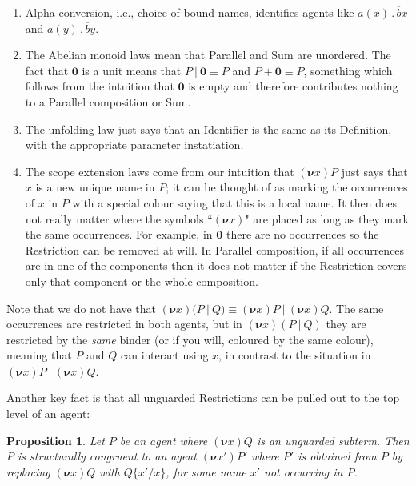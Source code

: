 \documentclass[10pt,a4paper]{article}
\newcommand{\resp}[1]{(\boldsymbol{\nu}#1)}
\newcommand{\res}[2]{\resp{#1}#2}
\newcommand{\nil}{\mathbf{0}}
\newcommand{\outp}[2]{\overline{#1}#2}
\newcommand{\inpp}[2]{#1(#2)}
\newcommand{\prefix}[2]{{#1}\,.\,#2}
\newcommand{\inp}[3]{\prefix{\inpp{#1}{#2}}{#3}}
\newcommand{\para}{\:|\:}
\newtheorem{theorem}{Proposition}
\begin{document}
\begin{enumerate}

\item Alpha-conversion, i.e., choice of bound names, identifies agents like $\inp{a}{x}{\outp{b}{x}}$ and $\inp{a}{y}{\outp{b}{y}}$.

\item The Abelian monoid laws mean that Parallel and Sum are unordered. The fact that $\nil$ is a unit means that $P \para \nil \equiv P$ and $P + \nil \equiv P$, something which follows from the intuition that $\nil$ is empty and therefore contributes nothing to a Parallel composition or Sum.

\item The unfolding law just says that an Identifier is the same as its Definition, with the appropriate parameter instatiation.

\item The scope extension laws come from our intuition that $\res{x}{P}$ just says that $x$ is a new unique name in $P$; it can be thought of as marking the occurrences of $x$ in $P$ with a special colour saying that this is a local name. It then does not really matter where the symbols ``$\resp{x}$" are placed as long as they mark the same occurrences. For example, in $\nil$ there are no occurrences so the Restriction can be removed at will. In Parallel composition, if all occurrences are in one of the components then it does not matter if the Restriction covers only that component or the whole composition.

\end{enumerate}

Note that we do not have that $\res{x}{(P \para Q)} \equiv \res{x}{P} \para \res{x}{Q}$. The same occurrences are restricted in both agents, but in $\res{x}{(P \para Q)}$ they are restricted by the \emph{same} binder (or if you will, coloured by the same colour), meaning that $P$ and $Q$ can interact using $x$, in contrast to the situation in $\res{x}{P} \para \res{x}{Q}$.

Another key fact is that all unguarded Restrictions can be pulled out to the top level of an agent:

\begin{theorem} Let $P$ be an agent where $\res{x}{Q}$ is an unguarded subterm. Then $P$ is structurally congruent to an agent $\res{x'}{P'}$  where $P'$ is obtained from $P$ by replacing $\res{x}{Q}$ with $Q\{x'/x\}$, for some name $x'$ not occurring in $P$.
\end{theorem}
\end{document}
